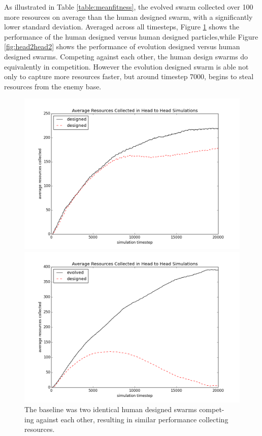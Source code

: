 \documentclass[conference,final]{IEEEtran}
\begin{document}
As illustrated in Table \ref{table:meanfitness}, the evolved swarm collected over 100 more resources on average than the human designed swarm, with a significantly lower standard deviation. Averaged across all timesteps, Figure \ref{fig:head2head1} shows the performance of the human designed versus human designed particles,while Figure \ref{fig:head2head2} shows the performance of evolution designed versus human designed swarms. Competing against each other, the human design swarms do equivalently in competition. However the evolution designed swarm is able not only to capture more resources faster, but around timestep 7000, begins to steal resources from the enemy base. 

\begin{figure}
\centering
\begin{minipage}{0.5\textwidth}
	\centering
    \includegraphics[width=\textwidth]{figures/designed_v_designed}
    \caption[width=0.45\textwidth]{The baseline was two identical human designed swarms compet- \\ ing against each other, resulting in similar performance collecting resources.}
    \label{fig:head2head1}
\end{minipage}%
\begin{minipage}{0.5\textwidth}
	\centering
    \includegraphics[width=\textwidth]{figures/evolved_v_designed}

\end{minipage}
\end{figure}
\end{document}
